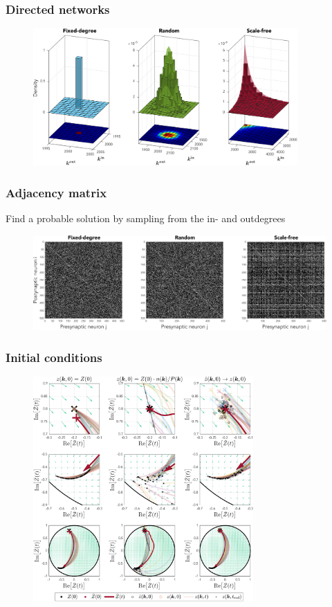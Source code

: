 \begin{frame}
\frametitle{Directed networks} 
\begin{figure}[ht]
\centering
\includegraphics[width = 0.9\textwidth]{../Figures/Distributions/2D.pdf}
\label{fig:2Ddistributions}
\end{figure}
\end{frame}

\begin{frame}
\frametitle{Adjacency matrix} 
Find a probable solution by sampling from the in- and outdegrees
\begin{figure}[H]
\centering
\includegraphics[width = \textwidth]{../Figures/Adjacency_matrices.pdf}
\label{fig:adjacencymatrices}
\end{figure}
\end{frame}

\begin{frame}
\frametitle{Initial conditions} 
\begin{figure}[H]
\centering
\includegraphics[trim=0cm 8.5cm 0cm 0cm, clip=true, width = 0.75\textwidth]{../Figures/PhaseSpace/Mappings.pdf}
   \label{fig:mappings}
\end{figure}
\end{frame}




